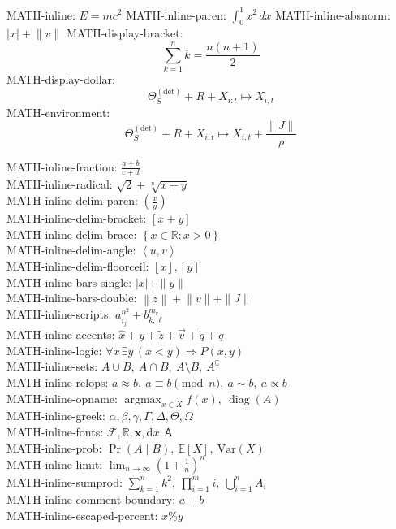 \documentclass[a4paper]{article}
\begin{document}
MATH-inline: $E=mc^2$
MATH-inline-paren: \(\int_0^1 x^2\,dx\)
MATH-inline-absnorm: $\left|x\right| + \lVert v \rVert$
MATH-display-bracket:
\[
  \sum_{k=1}^{n} k = \frac{n(n+1)}{2}
\]
MATH-display-dollar:
$$
  \Theta_S^{(\mathrm{det})} + R + X_{i:t} \mapsto X_{i,t}
$$
MATH-environment:
\begin{equation}
  \Theta_S^{(\mathrm{det})} + R + X_{i:t} \mapsto X_{i,t} + \frac{\|J\|}{\rho}
\end{equation}

MATH-inline-fraction: $\frac{a+b}{c+d}$ \\
MATH-inline-radical: $\sqrt{2} + \sqrt[n]{x+y}$ \\
MATH-inline-delim-paren: $\left(\frac{x}{y}\right)$ \\
MATH-inline-delim-bracket: $\left[x+y\right]$ \\
MATH-inline-delim-brace: $\left\{x\in\mathbb{R}:x>0\right\}$ \\
MATH-inline-delim-angle: $\left\langle u,v\right\rangle$ \\
MATH-inline-delim-floorceil: $\left\lfloor x \right\rfloor,\left\lceil y \right\rceil$ \\
MATH-inline-bars-single: $\left|x\right|+\|y\|$ \\
MATH-inline-bars-double: $\left\|z\right\|+\lVert v\rVert+\|J\|$ \\
MATH-inline-scripts: $a_{i_j}^{n^2}+b_{k,\ell}^{m_r}$ \\
MATH-inline-accents: $\hat{x}+\bar{y}+\tilde{z}+\vec{v}+\dot{q}+\ddot{q}$ \\
MATH-inline-logic: $\forall x\,\exists y\,(x<y)\Rightarrow P(x,y)$ \\
MATH-inline-sets: $A\cup B,\ A\cap B,\ A\setminus B,\ A^\complement$ \\
MATH-inline-relops: $a\approx b,\ a\equiv b\pmod n,\ a\sim b,\ a\propto b$ \\
MATH-inline-opname: $\operatorname{argmax}_{x\in X} f(x),\ \operatorname{diag}(A)$ \\
MATH-inline-greek: $\alpha,\beta,\gamma,\Gamma,\Delta,\Theta,\Omega$ \\
MATH-inline-fonts: $\mathcal{F},\mathbb{R},\mathbf{x},\mathrm{d}x,\mathsf{A}$ \\
MATH-inline-prob: $\Pr(A\mid B),\ \mathbb{E}[X],\ \mathrm{Var}(X)$ \\
MATH-inline-limit: $\lim_{n\to\infty}\left(1+\frac{1}{n}\right)^n$ \\
MATH-inline-sumprod: $\sum_{k=1}^{n}k^2,\ \prod_{i=1}^{m} i,\ \bigcup_{i=1}^{n}A_i$ \\
MATH-inline-comment-boundary: $a+b$ %
\\
MATH-inline-escaped-percent: $x \% y$
\end{document}
